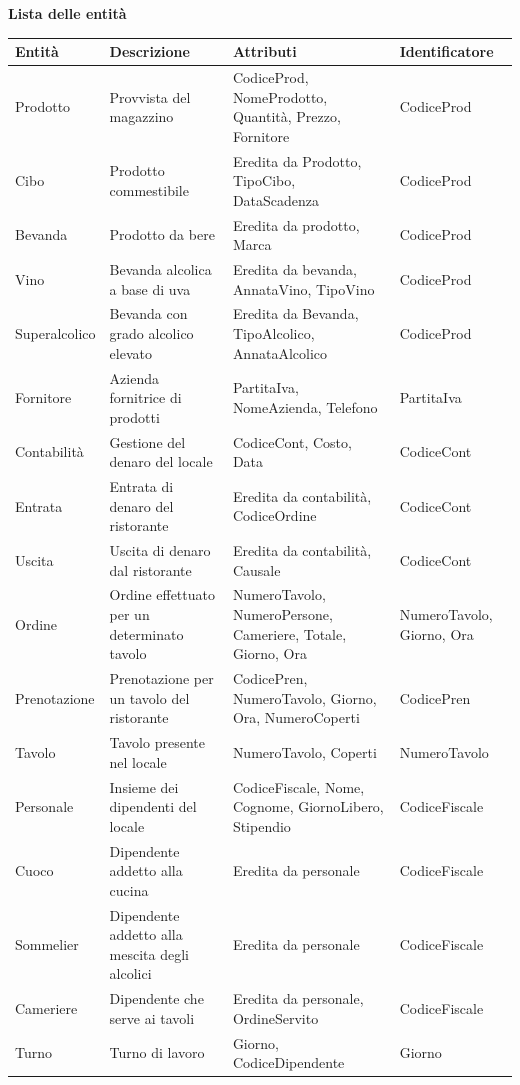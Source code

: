 \textbf{Lista delle entità}
\begin{longtable}{p{2.5cm} p{4cm} p{5cm} p{2.5cm}}
    \toprule
    \textbf{Entità} & \textbf{Descrizione} &   \textbf{Attributi} & \textbf{Identificatore}\\ \midrule
    Prodotto & Provvista del magazzino & CodiceProd, NomeProdotto, Quantità, Prezzo, Fornitore & CodiceProd\\ \midrule
    Cibo & Prodotto commestibile & Eredita da Prodotto, TipoCibo, DataScadenza & CodiceProd \\ \midrule
    Bevanda	& Prodotto da bere & Eredita da prodotto, Marca & CodiceProd\\ \midrule
    Vino & Bevanda alcolica a base di uva & Eredita da bevanda, AnnataVino, TipoVino & CodiceProd \\ \midrule
    Superalcolico & Bevanda con grado alcolico elevato & Eredita da Bevanda, TipoAlcolico, AnnataAlcolico & CodiceProd \\ \midrule
    Fornitore & Azienda fornitrice di prodotti & PartitaIva, NomeAzienda, Telefono & PartitaIva \\ \midrule
    Contabilità & Gestione del denaro del locale & CodiceCont, Costo, Data &CodiceCont \\ \midrule
    Entrata & Entrata di denaro del ristorante & Eredita da contabilità, CodiceOrdine& CodiceCont \\ \midrule
    Uscita & Uscita di denaro dal ristorante & Eredita da contabilità, Causale & CodiceCont \\ \midrule
    Ordine & Ordine effettuato per un determinato tavolo & NumeroTavolo, NumeroPersone, Cameriere, Totale, Giorno, Ora & NumeroTavolo, Giorno, Ora\\ \midrule
    Prenotazione & Prenotazione per un tavolo del ristorante & CodicePren, NumeroTavolo, Giorno, Ora, NumeroCoperti & CodicePren\\ \midrule
    Tavolo & Tavolo presente nel locale & NumeroTavolo, Coperti & NumeroTavolo\\ \midrule
    Personale & Insieme dei dipendenti del locale & CodiceFiscale, Nome, Cognome, GiornoLibero, Stipendio & CodiceFiscale\\ \midrule
    Cuoco & Dipendente addetto alla cucina & Eredita da personale & CodiceFiscale\\ \midrule
    Sommelier & Dipendente addetto alla mescita degli alcolici & Eredita da personale & CodiceFiscale\\ \midrule
    Cameriere & Dipendente che serve ai tavoli & Eredita da personale, OrdineServito & CodiceFiscale\\ \midrule
    Turno & Turno di lavoro & Giorno, CodiceDipendente & Giorno\\ 
    \bottomrule	
\end{longtable}

